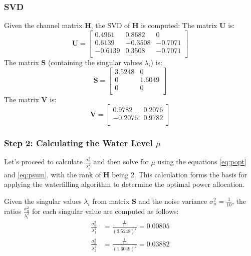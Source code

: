 \documentclass[lettersize,journal]{IEEEtran}
\begin{document}
\subsubsection{SVD}
Given the channel matrix \( \mathbf{H} \), the SVD of \( \mathbf{H} \) is computed:
The matrix \( \mathbf{U} \) is:
\begin{equation}
\mathbf{U} = \begin{bmatrix}
0.4961 & 0.8682 & 0 \\
0.6139 & -0.3508 & -0.7071 \\
-0.6139 & 0.3508 & -0.7071 \\
\end{bmatrix}
\end{equation}
The matrix \( \mathbf{S} \) (containing the singular values \( \lambda_i \)) is:
\begin{equation}
\mathbf{S} = \begin{bmatrix}
3.5248 & 0 \\
0 & 1.6049  \\
0 & 0  \\
\end{bmatrix}
\end{equation}
The matrix \( \mathbf{V} \) is:
\begin{equation}
\mathbf{V} = \begin{bmatrix}
0.9782 & 0.2076 \\
-0.2076 & 0.9782 \\
\end{bmatrix}
\end{equation}

\subsubsection{Step 2: Calculating the Water Level \( \mu \)}
Let's proceed to calculate \( \frac{\sigma_n^2}{\lambda_i^2} \) and then solve for \( \mu \) using the equations \eqref{eq:popt} and \eqref{eq:psum}, with the rank of \( \mathbf{H} \) being 2. This calculation forms the basis for applying the waterfilling algorithm to determine the optimal power allocation.

Given the singular values \( \lambda_i \) from matrix \( \mathbf{S} \) and the noise variance \( \sigma_n^2 = \frac{1}{10} \), the ratios \( \frac{\sigma_n^2}{\lambda_i^2} \) for each singular value are computed as follows:
\begin{equation}
\begin{aligned}
\frac{\sigma_n^2}{\lambda_1^2} &= \frac{\frac{1}{10}}{(3.5248)^2} = 0.00805 \\
\frac{\sigma_n^2}{\lambda_2^2} &= \frac{\frac{1}{10}}{(1.6049)^2} = 0.03882
\end{aligned}
\end{equation}
\end{document}
